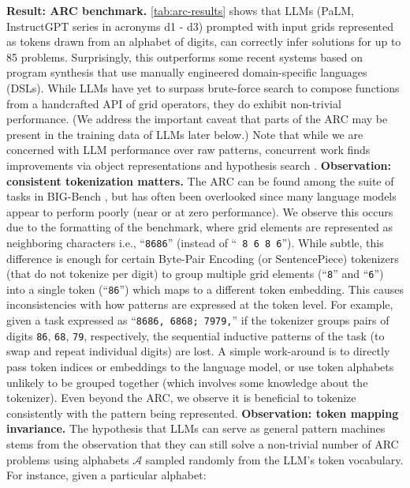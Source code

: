 \documentclass{article}
\renewcommand{\tt}[1]{{\texttt{#1}}}
\newcommand{\ie}{i.e., }
\begin{document}
\textbf{Result: ARC benchmark.} \cref{tab:arc-results} shows that LLMs (PaLM, InstructGPT series in acronyms d1 - d3) prompted with input grids represented as tokens drawn from an alphabet of digits, can correctly infer solutions for up to 85 problems. Surprisingly, this outperforms some recent systems \cite{ferre2021first,xu2022graphs} based on program synthesis that use manually engineered domain-specific languages (DSLs).
While LLMs have yet to surpass brute-force search \cite{ainooson2023approach} to compose functions from a handcrafted API of grid operators, they do exhibit non-trivial performance. (We address the important caveat that parts of the ARC may be present in the training data of LLMs later below.) Note that while we are concerned with LLM performance over raw patterns, concurrent work finds  improvements via object representations \cite{xu2023llms} and hypothesis search \cite{wang2023hypothesis}.
\textbf{Observation: consistent tokenization matters.} The ARC can be found among the suite of tasks in BIG-Bench \cite{srivastava2022beyond}, but has often been overlooked since many language models appear to perform poorly (near or at zero performance). We observe this occurs due to the formatting of the benchmark, where grid elements are represented as neighboring characters \ie ``\tt{8686}'' (instead of ``\tt{ 8 6 8 6}''). While subtle, this difference is enough for certain Byte-Pair Encoding (or SentencePiece) tokenizers \cite{sennrich2015neural,kudo2018sentencepiece} (that do not tokenize per digit) to group  multiple grid elements (``\tt{8}'' and ``\tt{6}'') into a single token (``\tt{86}'') which maps to a different token embedding. This causes inconsistencies with how patterns are expressed at the token level. For example, given a task expressed as ``\tt{8686, 6868; 7979,}'' if the tokenizer groups pairs of digits \tt{86}, \tt{68}, \tt{79}, respectively, the sequential inductive patterns of the task (to swap and repeat individual digits) are lost. A simple work-around is to directly pass token indices or embeddings to the language model, or use token alphabets unlikely to be grouped together (which involves some knowledge about the tokenizer). Even beyond the ARC, we observe it is beneficial to tokenize  consistently with the pattern being represented. 
\textbf{Observation: token mapping invariance.} The hypothesis that LLMs can serve as general pattern machines stems from the observation that they can still solve a non-trivial number of ARC problems using alphabets $\mathcal{A}$ sampled randomly from the LLM's token vocabulary. For instance, given a particular alphabet:
\end{document}
